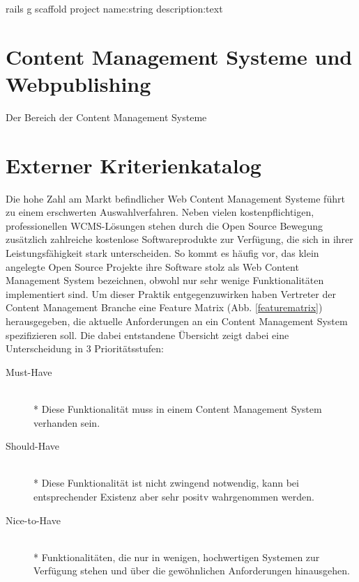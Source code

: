 \begin{lstinputlisting}
rails g scaffold project name:string description:text
\end{lstinputlisting}





\section{Content Management Systeme und Webpublishing}
Der Bereich der Content Management Systeme


\newpage

\section{Externer Kriterienkatalog}
Die hohe Zahl am Markt befindlicher Web Content Management Systeme führt zu einem erschwerten Auswahlverfahren. Neben vielen kostenpflichtigen, professionellen WCMS-Lösungen stehen durch die Open Source Bewegung zusätzlich zahlreiche kostenlose Softwareprodukte zur Verfügung, die sich in ihrer Leistungsfähigkeit stark unterscheiden.
So kommt es häufig vor, das klein angelegte Open Source Projekte ihre Software stolz als Web Content Management System bezeichnen, obwohl nur sehr wenige Funktionalitäten implementiert sind.
Um dieser Praktik entgegenzuwirken haben Vertreter der Content Management Branche eine Feature Matrix (Abb. \ref{featurematrix}) herausgegeben, die aktuelle Anforderungen an ein Content Management System spezifizieren soll. Die dabei entstandene Übersicht zeigt dabei eine Unterscheidung in 3 Prioritätsstufen:
\begin{description}
\item[Must-Have]\mbox{~}\\*
Diese Funktionalität muss in einem Content Management System verhanden sein.
\item[Should-Have]\mbox{~}\\*
Diese Funktionalität ist nicht zwingend notwendig, kann bei entsprechender Existenz aber sehr positv wahrgenommen werden.
\item[Nice-to-Have]\mbox{~}\\*
Funktionalitäten, die nur in wenigen, hochwertigen Systemen zur Verfügung stehen und über die gewöhnlichen Anforderungen hinausgehen.
\end{description}


